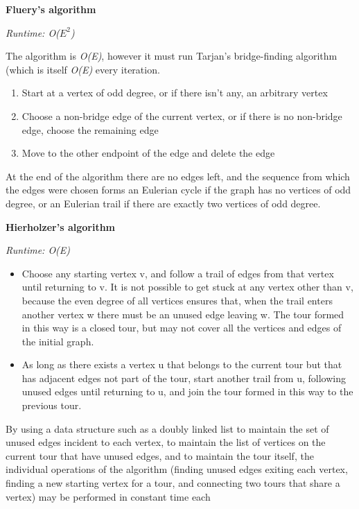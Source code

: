 \textbf{Fluery's algorithm}

\textit{Runtime: O($E^2$)}

The algorithm is \textit{O(E)}, however it must run Tarjan's bridge-finding algorithm (which is itself \textit{O(E)} every iteration.

\begin{enumerate}
    \item Start at a vertex of odd degree, or if there isn't any, an arbitrary vertex
    \item Choose a non-bridge edge of the current vertex, or if there is no non-bridge edge, choose the remaining edge
    \item Move to the other endpoint of the edge and delete the edge
\end{enumerate}

At the end of the algorithm there are no edges left, and the sequence from which the edges were chosen forms an Eulerian cycle if the graph has no vertices of odd degree, or an Eulerian trail if there are exactly two vertices of odd degree.

\textbf{Hierholzer's algorithm}

\textit{Runtime: O(E)}

\begin{itemize}
    \item Choose any starting vertex v, and follow a trail of edges from that vertex until returning to v. It is not possible to get stuck at any vertex other than v, because the even degree of all vertices ensures that, when the trail enters another vertex w there must be an unused edge leaving w. The tour formed in this way is a closed tour, but may not cover all the vertices and edges of the initial graph.
    \item As long as there exists a vertex u that belongs to the current tour but that has adjacent edges not part of the tour, start another trail from u, following unused edges until returning to u, and join the tour formed in this way to the previous tour.
\end{itemize}

By using a data structure such as a doubly linked list to maintain the set of unused edges incident to each vertex, to maintain the list of vertices on the current tour that have unused edges, and to maintain the tour itself, the individual operations of the algorithm (finding unused edges exiting each vertex, finding a new starting vertex for a tour, and connecting two tours that share a vertex) may be performed in constant time each


